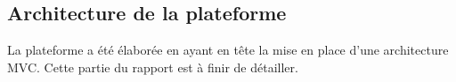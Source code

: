 \subsection{Architecture de la plateforme}

La plateforme a été élaborée en ayant en tête la mise en place d'une architecture MVC. Cette partie du rapport est à finir de détailler.

